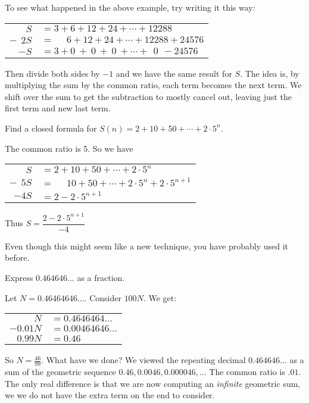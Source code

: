 \documentclass[12pt]{article}
\begin{document}
To see what happened in the above example, try writing it this way:

\begin{center}
\begin{tabular}{rl}
  $S $& $= 3 + 6 + 12 + 24 + \cdots + 12288$ \\
 $-~~2S$ & $= ~~~~~~6 + 12 + 24 + \cdots + 12288 + 24576 $\\ \hline
 $-S$ &$ = 3 + 0 ~+~ 0 ~+~ 0 ~ +  \cdots + ~~0 ~~ - 24576$
\end{tabular}
\end{center}

Then divide both sides by $-1$ and we have the same result for $S$.  The idea is, by multiplying the sum by the common ratio, each term becomes the next term.  We shift over the sum to get the subtraction to mostly cancel out, leaving just the first term and new last term.

\begin{example}
  Find a closed formula for $S(n) = 2 + 10 + 50 + \cdots + 2\cdot 5^n$.
  \begin{solution}
    The common ratio is 5.  So we have
    
    \begin{center}
\begin{tabular}{rl}
  $S $& $= 2 + 10 + 50 + \cdots + 2\cdot 5^n$ \\
 $-~~5S$ & $= ~~~~~~10 + 50 + \cdots + 2\cdot 5^n + 2\cdot5^{n+1} $\\ \hline
 $-4S$ &$ = 2  - 2\cdot5^{n+1}$
\end{tabular}
\end{center}

Thus $S = \dfrac{2-2\cdot 5^{n+1}}{-4}$
  \end{solution}
\end{example}

Even though this might seem like a new technique, you have probably used it before.  

\begin{example}
  Express $0.464646\ldots$ as a fraction.
  
  \begin{solution}
    Let $N = 0.46464646\ldots$.  Consider $100N$.  We get:
    
    \begin{center}
    \begin{tabular}{rl}
     $N$ &$ = 0.4646464\ldots$\\
     $-0.01N$ &$ = 0.00464646\ldots$\\ \hline
     $0.99N$ & $ = 0.46$
    \end{tabular}
    \end{center}
    So $N = \frac{46}{99}$.  What have we done?  We viewed the repeating decimal $0.464646\ldots$ as a sum of the geometric sequence $0.46, 0.0046, 0.000046, \ldots$  The common ratio is $.01$.  The only real difference is that we are now computing an {\em infinite} geometric sum, we we do not have the extra term on the end to consider.
  \end{solution}

\end{example}
\end{document}
